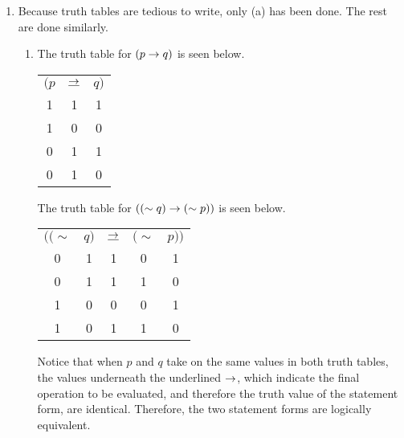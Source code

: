 \begin{enumerate}
  \item %
    Because truth tables are tedious to write, only (a) has been done. The rest are done similarly.
    \begin{enumerate}[(\alph*), align=left]
      \item The truth table for \((p \rightarrow q)\) is seen below.

        \begin{center}
          \begin{tabular}{ccc}
            \((p\)&
            \(\underline{\rightarrow}\)&
            \(q)\)\\

            1&
            1&
            1\\

            1&
            0&
            0\\

            0&
            1&
            1\\

            0&
            1&
            0
          \end{tabular}
        \end{center}

        The truth table for \(((\sim q) \rightarrow (\sim p))\) is seen below.

        \begin{center}
          \begin{tabular}{ccccc}
            \(((\sim\)&
            \(q)\)&
            \(\underline{\rightarrow}\)&
            \((\sim\)&
            \(p))\)\\

            0&
            1&
            1&
            0&
            1\\

            0&
            1&
            1&
            1&
            0\\

            1&
            0&
            0&
            0&
            1\\

            1&
            0&
            1&
            1&
            0
          \end{tabular}
        \end{center}

        Notice that when \(p\) and \(q\) take on the same values in both truth tables, the values underneath the underlined \(\rightarrow\), which indicate the final operation to be evaluated, and therefore the truth value of the statement form, are identical. Therefore, the two statement forms are logically equivalent.
    \end{enumerate}


\end{enumerate}
